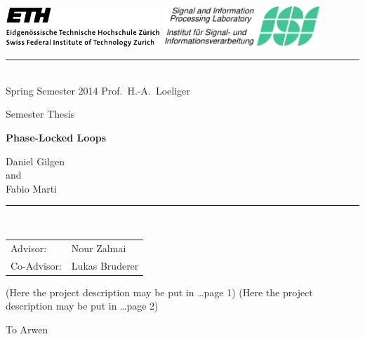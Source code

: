 \documentclass[11pt,a4paper,twoside]{report}
\begin{document}
\pagestyle{plain}

\begin{titlepage}
  \begin{center}
    \includegraphics[height=15mm]{gfx/ethlogo} \hfill
    \includegraphics[height=15.5mm]{gfx/isilogo_left}
    \rule{\textwidth}{0.5pt}\\[1ex]
    {\Large Spring Semester 2014 \hfill 
      Prof.~H.-A.~Loeliger
    }

    \LARGE Semester Thesis

    \Huge\textbf{
      Phase-Locked Loops
    }
    
    \LARGE{
      Daniel Gilgen\\
      and \\
      Fabio Marti \\
    }
    
  \end{center}
  \rule{\textwidth}{0.5pt}\\[2ex]
  \noindent
  \begin{tabular}{@{}ll@{}}
    \Large Advisor: & \Large Nour Zalmai\\[1ex]
    \Large Co-Advisor: & \Large Lukas Bruderer
  \end{tabular}
\end{titlepage}

\cleardoublepage
(Here the project description may be put in \ldots page 1)
\clearpage
(Here the project description may be put in \ldots page 2)
\cleardoublepage




\thispagestyle{empty}
\bigskip
\begin{center}   
  To Arwen
\end{center}
\end{document}

